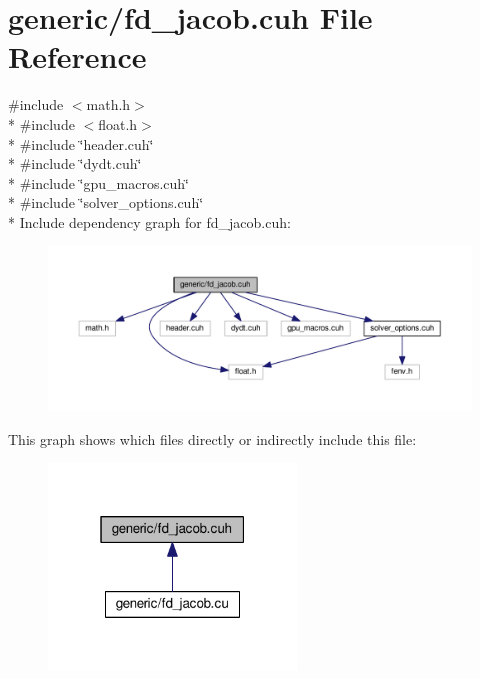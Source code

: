\hypertarget{fd__jacob_8cuh}{}\section{generic/fd\+\_\+jacob.cuh File Reference}
\label{fd__jacob_8cuh}
{\ttfamily \#include $<$math.\+h$>$}\\*
{\ttfamily \#include $<$float.\+h$>$}\\*
{\ttfamily \#include \char`\"{}header.\+cuh\char`\"{}}\\*
{\ttfamily \#include \char`\"{}dydt.\+cuh\char`\"{}}\\*
{\ttfamily \#include \char`\"{}gpu\+\_\+macros.\+cuh\char`\"{}}\\*
{\ttfamily \#include \char`\"{}solver\+\_\+options.\+cuh\char`\"{}}\\*
Include dependency graph for fd\+\_\+jacob.\+cuh\+:\nopagebreak
\begin{figure}[H]
\begin{center}
\leavevmode
\includegraphics[width=350pt]{fd__jacob_8cuh__incl}
\end{center}
\end{figure}
This graph shows which files directly or indirectly include this file\+:\nopagebreak
\begin{figure}[H]
\begin{center}
\leavevmode
\includegraphics[width=187pt]{fd__jacob_8cuh__dep__incl}
\end{center}
\end{figure}
